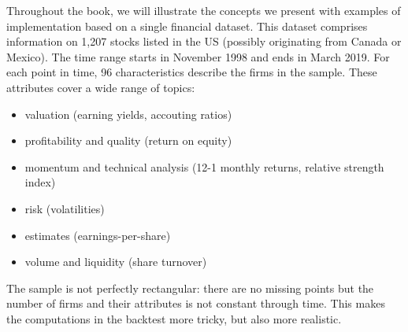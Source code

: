 \documentclass[]{krantz}
\makeatletter
\newenvironment{Shaded}{\begin{snugshade}}{\end{snugshade}}
\newcommand{\CommentTok}[1]{\textcolor[rgb]{0.37,0.37,0.37}{\textit{#1}}}
\newcommand{\DecValTok}[1]{\textcolor[rgb]{0.06,0.06,0.06}{#1}}
\newcommand{\KeywordTok}[1]{\textcolor[rgb]{0.27,0.27,0.27}{\textbf{#1}}}
\newcommand{\NormalTok}[1]{#1}
\newcommand{\OperatorTok}[1]{\textcolor[rgb]{0.43,0.43,0.43}{\textbf{#1}}}
\newcommand{\StringTok}[1]{\textcolor[rgb]{0.5,0.5,0.5}{#1}}
\providecommand{\tightlist}{%
  \setlength{\itemsep}{0pt}\setlength{\parskip}{0pt}}
\newenvironment{kframe}{%
\medskip{}
\setlength{\fboxsep}{.8em}
 \def\at@end@of@kframe{}%
 \ifinner\ifhmode%
  \def\at@end@of@kframe{\end{minipage}}%
  \begin{minipage}{\columnwidth}%
 \fi\fi%
 \def\FrameCommand##1{\hskip\@totalleftmargin \hskip-\fboxsep
 \colorbox{shadecolor}{##1}\hskip-\fboxsep
     \hskip-\linewidth \hskip-\@totalleftmargin \hskip\columnwidth}%
 \MakeFramed {\advance\hsize-\width
   \@totalleftmargin\z@ \linewidth\hsize
   \@setminipage}}%
 {\par\unskip\endMakeFramed%
 \at@end@of@kframe}
\renewenvironment{Shaded}{\begin{kframe}}{\end{kframe}}
\theoremstyle{definition}
\theoremstyle{definition}
\theoremstyle{definition}
\theoremstyle{remark}
\makeatother
\begin{document}
Throughout the book, we will illustrate the concepts we present with
examples of implementation based on a single financial dataset. This
dataset comprises information on 1,207 stocks listed in the US (possibly
originating from Canada or Mexico). The time range starts in November
1998 and ends in March 2019. For each point in time, 96 characteristics
describe the firms in the sample. These attributes cover a wide range of
topics:

\begin{itemize}
\tightlist
\item
  valuation (earning yields, accouting ratios)\\
\item
  profitability and quality (return on equity)\\
\item
  momentum and technical analysis (12-1 monthly returns, relative
  strength index)\\
\item
  risk (volatilities)\\
\item
  estimates (earnings-per-share)\\
\item
  volume and liquidity (share turnover)
\end{itemize}

The sample is not perfectly rectangular: there are no missing points but
the number of firms and their attributes is not constant through time.
This makes the computations in the backtest more tricky, but also more
realistic.

\footnotesize

\begin{Shaded}
\end{Shaded}
\end{document}
